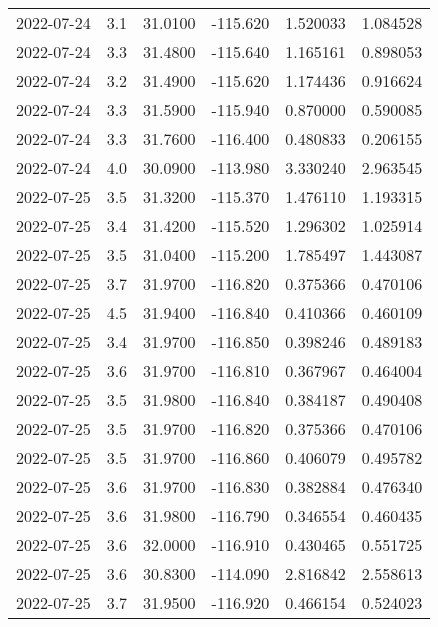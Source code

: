 \begin{tabular}{lrrrrr}
2022-07-24 &       3.1 &  31.0100 &  -115.620 &         1.520033 &         1.084528 \\
2022-07-24 &       3.3 &  31.4800 &  -115.640 &         1.165161 &         0.898053 \\
2022-07-24 &       3.2 &  31.4900 &  -115.620 &         1.174436 &         0.916624 \\
2022-07-24 &       3.3 &  31.5900 &  -115.940 &         0.870000 &         0.590085 \\
2022-07-24 &       3.3 &  31.7600 &  -116.400 &         0.480833 &         0.206155 \\
2022-07-24 &       4.0 &  30.0900 &  -113.980 &         3.330240 &         2.963545 \\
2022-07-25 &       3.5 &  31.3200 &  -115.370 &         1.476110 &         1.193315 \\
2022-07-25 &       3.4 &  31.4200 &  -115.520 &         1.296302 &         1.025914 \\
2022-07-25 &       3.5 &  31.0400 &  -115.200 &         1.785497 &         1.443087 \\
2022-07-25 &       3.7 &  31.9700 &  -116.820 &         0.375366 &         0.470106 \\
2022-07-25 &       4.5 &  31.9400 &  -116.840 &         0.410366 &         0.460109 \\
2022-07-25 &       3.4 &  31.9700 &  -116.850 &         0.398246 &         0.489183 \\
2022-07-25 &       3.6 &  31.9700 &  -116.810 &         0.367967 &         0.464004 \\
2022-07-25 &       3.5 &  31.9800 &  -116.840 &         0.384187 &         0.490408 \\
2022-07-25 &       3.5 &  31.9700 &  -116.820 &         0.375366 &         0.470106 \\
2022-07-25 &       3.5 &  31.9700 &  -116.860 &         0.406079 &         0.495782 \\
2022-07-25 &       3.6 &  31.9700 &  -116.830 &         0.382884 &         0.476340 \\
2022-07-25 &       3.6 &  31.9800 &  -116.790 &         0.346554 &         0.460435 \\
2022-07-25 &       3.6 &  32.0000 &  -116.910 &         0.430465 &         0.551725 \\
2022-07-25 &       3.6 &  30.8300 &  -114.090 &         2.816842 &         2.558613 \\
2022-07-25 &       3.7 &  31.9500 &  -116.920 &         0.466154 &         0.524023 \\

\end{tabular}

